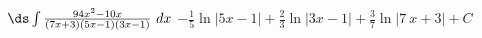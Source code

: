 {$\ds \int \frac{94x^2-10x}{(7x+3)(5x-1)(3x-1)}\ dx$}
{$-\frac{1}{5} \ln |5x-1|+\frac{2}{3} \ln |3 x-1|+\frac{3}{7} \ln |7 \
x+3|+C$}
